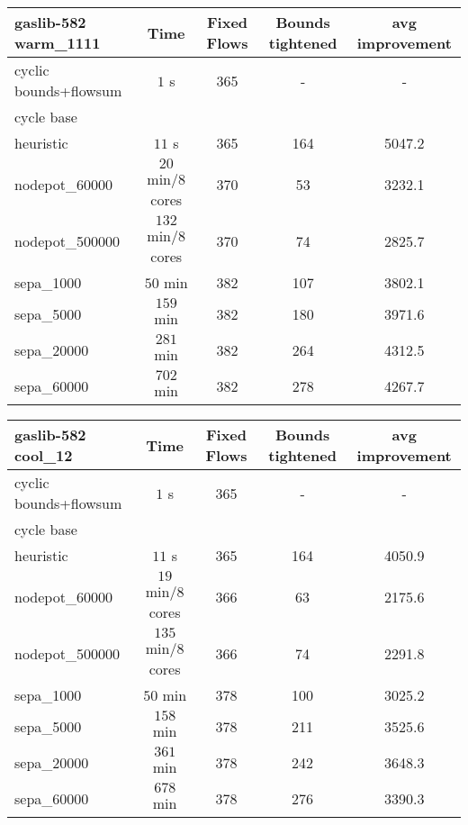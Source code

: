 \begin{center}
\begin{tabular}{ l | c | c | c | c }
\textbf{gaslib-582 warm\_1111} & Time  & Fixed Flows & Bounds tightened & avg improvement \\
\hline
 cyclic bounds+flowsum& $1$ s& 365 & - & -\\
 cycle base& $ $ &  &  &\\
 heuristic& $ 11$ s& 365& 164 & 5047.2 \\
 nodepot\_60000& $20$ min/8 cores &370  &53  &3232.1   \\ 
 nodepot\_500000& $132$ min/8 cores & 370 & 74 & 2825.7  \\ 
 sepa\_1000& $ 50$ min & 382 & 107 & 3802.1 \\
 sepa\_5000& $ 159$ min & 382 & 180 & 3971.6 \\
 sepa\_20000& $ 281$ min & 382 & 264 & 4312.5 \\
 sepa\_60000& $702$ min  & 382& 278& 4267.7\\
\end{tabular} 
\end{center}

\begin{center}
\begin{tabular}{ l | c | c | c | c }

\textbf{gaslib-582 cool\_12} & Time  & Fixed Flows & Bounds tightened & avg improvement\\
\hline
 cyclic bounds+flowsum& $1$ s & 365 & - & - \\
 cycle base& $ $ &  &  & \\
 heuristic& $11$ s & 365 & 164 & 4050.9 \\
 nodepot\_60000& $19$ min/8 cores & 366 & 63 &  2175.6 \\ 
 nodepot\_500000& $135$ min/8 cores & 366 & 74 & 2291.8  \\ 
 sepa\_1000& $ 50$ min  & 378 & 100 & 3025.2\\
 sepa\_5000& $ 158$ min & 378 & 211 & 3525.6\\ 
 sepa\_20000& $ 361$ min & 378 & 242 & 3648.3  \\
 sepa\_60000& $678$ min  & 378 & 276 & 3390.3 \\
\end{tabular} 
\end{center}

